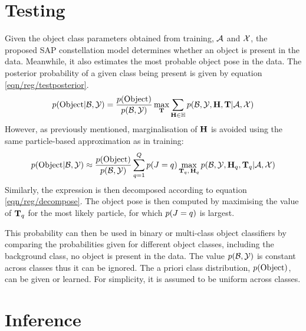\section{Testing}

Given the object class parameters obtained from training, $\mathcal{A}$ and $\mathcal{X}$, the proposed SAP constellation model determines whether an object is present in the data. Meanwhile, it also estimates the most probable object pose in the data. 
The posterior probability of a given class being present is given by equation \ref{eqn/reg/testposterior}. 
\begin{equation}
	p(\mathrm{Object}|\mathcal{B},\mathcal{Y}) = \frac{p(\mathrm{Object})}{p(\mathcal{B},\mathcal{Y})}\max_{\mathbf{T}}\sum_{\mathbf{H} \in \mathbb{H}}p(\mathcal{B},\mathcal{Y},\mathbf{H},\mathbf{T}|\mathcal{A},\mathcal{X})
	\label{eqn/reg/testposterior}
\end{equation}
However, as previously mentioned, marginalisation of $\mathbf{H}$ is avoided using the same particle-based approximation as in training:
\begin{equation}
	p(\mathrm{Object}|\mathcal{B},\mathcal{Y}) \approx \frac{p(\mathrm{Object})}{p(\mathcal{B},\mathcal{Y})} \sum_{q=1}^Q p({J} = q)
	\max_{\mathbf{T}_q,\,\mathbf{H}_q} p(\mathcal{B},\mathcal{Y},\mathbf{H}_q,\mathbf{T}_q|\mathcal{A},\mathcal{X})
	\label{eqn/reg/testobjective}
\end{equation}
Similarly, the expression is then decomposed according to equation \ref{eqn/reg/decompose}.
The object pose is then computed by maximising the value of $\mathbf{T}_q$ for the most likely particle, \ie for which $p({J} = q)$ is largest.

This probability can then be used in binary or multi-class object classifiers by comparing the probabilities given for different object classes, including the background class, \ie no object is present in the data. The value $p(\mathcal{B},\mathcal{Y})$ is constant across classes thus it can be ignored. The a priori class distribution, $p(\mathrm{Object})$, can be given or learned. For simplicity, it is assumed to be uniform across classes. 

\section{Inference}
\label{sec/reg/optimisation}


